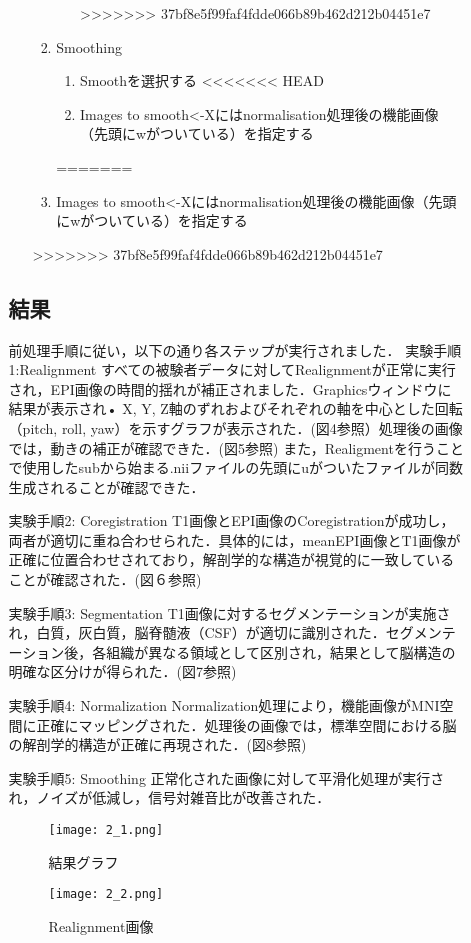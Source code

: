 \documentclass{jlreq}
\begin{document}
\begin{enumerate}
\begin{enumerate}
\begin{enumerate}
\begin{enumerate}
\begin{enumerate}
>>>>>>> 37bf8e5f99faf4fdde066b89b462d212b04451e7
        \end{enumerate}
    \item Smoothing
    \begin{enumerate}
        \item Smoothを選択する
<<<<<<< HEAD
        \item Images to smooth<-Xにはnormalisation処理後の機能画像（先頭にwがついている）を指定する  \end{enumerate}
=======
        \item Images to smooth<-Xにはnormalisation処理後の機能画像（先頭にwがついている）を指定する 
    \end{enumerate}
>>>>>>> 37bf8e5f99faf4fdde066b89b462d212b04451e7
\end{enumerate}
\subsection{結果}
前処理手順に従い，以下の通り各ステップが実行されました．
実験手順1:Realignment
すべての被験者データに対してRealignmentが正常に実行され，EPI画像の時間的揺れが補正されました．Graphicsウィンドウに結果が表示され• X, Y, Z軸のずれおよびそれぞれの軸を中心とした回転（pitch, roll, yaw）を示すグラフが表示された．(図4参照）処理後の画像では，動きの補正が確認できた．(図5参照)
また，Realigmentを行うことで使用したsubから始まる.niiファイルの先頭にuがついたファイルが同数生成されることが確認できた．


実験手順2: Coregistration
T1画像とEPI画像のCoregistrationが成功し，両者が適切に重ね合わせられた．具体的には，meanEPI画像とT1画像が正確に位置合わせされており，解剖学的な構造が視覚的に一致していることが確認された．(図６参照)


実験手順3: Segmentation
T1画像に対するセグメンテーションが実施され，白質，灰白質，脳脊髄液（CSF）が適切に識別された．セグメンテーション後，各組織が異なる領域として区別され，結果として脳構造の明確な区分けが得られた．(図7参照)

実験手順4: Normalization
Normalization処理により，機能画像がMNI空間に正確にマッピングされた．処理後の画像では，標準空間における脳の解剖学的構造が正確に再現された．(図8参照)

実験手順5: Smoothing 
正常化された画像に対して平滑化処理が実行され，ノイズが低減し，信号対雑音比が改善された．


\begin{figure}[H]
    \centering
        \begin{minipage}{0.45\textwidth}
        \centering
        \texttt{[image: 2\_1.png]}
        \caption{結果グラフ}
        \label{fig:brain_T1}
    \end{minipage}
    \hfill
    \begin{minipage}{0.45\textwidth}
        \centering
        \texttt{[image: 2\_2.png]}
        \caption{Realignment画像}
        \label{fig:brain_T1}
    \end{minipage}
    \hfill
\end{figure}



\end{enumerate}
\end{enumerate}
\end{document}
